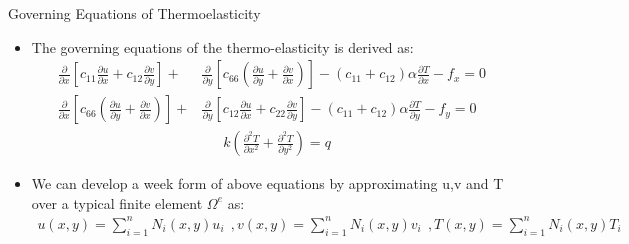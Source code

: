 \documentclass{beamer}
\begin{document}
   \begin{frame}[t,fragile]{Governing Equations of Thermoelasticity}
    \begin{itemize}
        \item The governing equations of the thermo-elasticity is derived as: 
            \bgroup
            \footnotesize
            \begin{align*}
    \frac{\partial}{\partial x}\left[c_{11}\frac{\partial u}{\partial x}+c_{12}\frac{\partial v}{\partial y}\right]+&\frac{\partial}{\partial y}\left[c_{66}\left(\frac{\partial u}{\partial y}+\frac{\partial v}{\partial x}\right)\right]-(c_{11}+c_{12})\alpha\frac{\partial T}{\partial x}-f_x   =0 \\
    \frac{\partial}{\partial x}\left[c_{66}\left(\frac{\partial u}{\partial y}+\frac{\partial v}{\partial x}\right)\right]+&\frac{\partial}{\partial y}\left[c_{12}\frac{\partial u}{\partial x}+c_{22}\frac{\partial v}{\partial y}\right]-(c_{11}+c_{12})\alpha\frac{\partial T}{\partial y}-f_y=0\\
    &\ \ \ \ \ \ \ k\left( \frac{\partial^2 T}{\partial x^2}+\frac{\partial^2 T}{\partial y^2} \right)=q
\end{align*}
\egroup
      \item We can develop a week form of above equations by approximating u,v and T over a typical finite element $\Omega^e$ as:
          \footnotesize
\begin{align*}
    u(x,y)=\sum_{i=1}^nN_i (x,y)u_i\ \ , 
    v(x,y)=\sum_{i=1}^nN_i (x,y)v_i\ \ ,
    T(x,y)=\sum_{i=1}^nN_i (x,y)T_i
\end{align*}
\end{itemize}
\end{frame}
\end{document}
